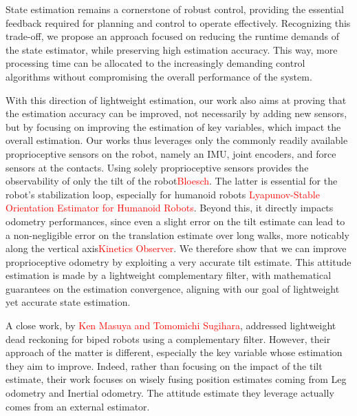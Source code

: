 \documentclass{IJCAS}
\begin{document}
State estimation remains a cornerstone of robust control, providing the essential feedback required for planning and control to operate effectively. Recognizing this trade-off, we propose an approach focused on reducing the runtime demands of the state estimator, while preserving high estimation accuracy. This way, more processing time can be allocated to the increasingly demanding control algorithms without compromising the overall performance of the system. 

With this direction of lightweight estimation, our work also aims at proving that the estimation accuracy can be improved, not necessarily by adding new sensors, but by focusing on improving the estimation of key variables, which impact the overall estimation. Our works thus leverages only the commonly readily available proprioceptive sensors on the robot, namely an IMU, joint encoders, and force sensors at the contacts. Using solely proprioceptive sensors provides the observability of only the tilt of the robot\textcolor{red}{Bloesch}. The latter is essential for the robot's stabilization loop, especially for humanoid robots \textcolor{red}{Lyapunov-Stable Orientation Estimator for Humanoid Robots}. Beyond this, it directly impacts odometry performances, since even a slight error on the tilt estimate can lead to a non-negligible error on the translation estimate over long walks, more noticably along the vertical axis\textcolor{red}{Kinetics Observer}. We therefore show that we can improve proprioceptive odometry by exploiting a very accurate tilt estimate. This attitude estimation is made by a lightweight complementary filter, with mathematical guarantees on the estimation convergence, aligning with our goal of lightweight yet accurate state estimation.

A close work, by \textcolor{red}{Ken Masuya and Tomomichi Sugihara}, addressed lightweight dead reckoning for biped robots using a complementary filter. However, their approach of the matter is different, especially the key variable whose estimation they aim to improve. Indeed, rather than focusing on the impact of the tilt estimate, their work focuses on wisely fusing position estimates coming from Leg odometry and Inertial odometry. The attitude estimate they leverage actually comes from an external estimator. 
\end{document}
